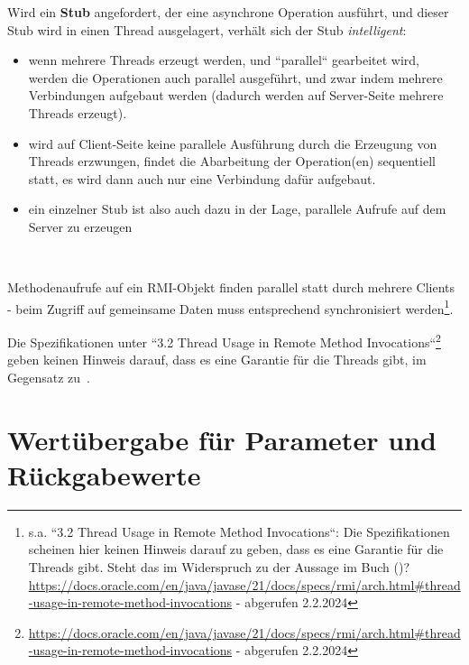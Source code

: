 \noindent
Wird ein \textbf{Stub} angefordert, der eine asynchrone Operation ausführt, und dieser Stub wird in einen Thread ausgelagert, verhält sich der Stub \textit{intelligent}:

\begin{itemize}
    \item wenn mehrere Threads erzeugt werden, und ``parallel`` gearbeitet wird, werden die Operationen auch parallel ausgeführt, und zwar indem mehrere Verbindungen aufgebaut werden (dadurch werden auf Server-Seite mehrere Threads erzeugt).
    \item wird auf Client-Seite keine parallele Ausführung durch die Erzeugung von Threads erzwungen, findet die Abarbeitung der Operation(en) sequentiell statt, es wird dann auch nur eine Verbindung dafür aufgebaut.
    \item ein einzelner Stub ist also auch dazu in der Lage, parallele Aufrufe auf dem Server zu erzeugen
\end{itemize}\\


\begin{tcolorbox}
    Methodenaufrufe auf ein RMI-Objekt finden parallel statt durch mehrere Clients - beim Zugriff auf gemeinsame Daten muss entsprechend synchronisiert werden\footnote{
        s.a. ``3.2 Thread Usage in Remote Method Invocations``: Die Spezifikationen scheinen hier keinen Hinweis darauf zu geben, dass es eine Garantie für die Threads gibt. Steht das im Widerspruch zu der Aussage im Buch (\cite[330]{Oec22})? \url{https://docs.oracle.com/en/java/javase/21/docs/specs/rmi/arch.html#thread-usage-in-remote-method-invocations} - abgerufen 2.2.2024
    }.
\end{tcolorbox}

\begin{tcolorbox}[colback=red!20,color=white,title=Anmerkung]
    Die Spezifikationen unter ``3.2 Thread Usage in Remote Method Invocations``\footnote{
        \url{https://docs.oracle.com/en/java/javase/21/docs/specs/rmi/arch.html#thread-usage-in-remote-method-invocations} - abgerufen 2.2.2024
    } geben keinen Hinweis darauf, dass es eine Garantie für die Threads gibt, im Gegensatz zu~\cite[330]{Oec22}.
\end{tcolorbox}

\section{Wertübergabe für Parameter und Rückgabewerte}

